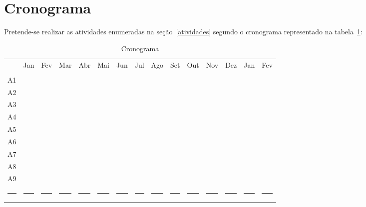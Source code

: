 \section{Cronograma}
\label{cronograma}


Pretende-se realizar as atividades enumeradas na seção~\ref{atividades} segundo o cronograma representado na tabela~\ref{table:cronograma}: 

\begin{table}[h]
\centering
\begin{tabular}{|c|c|c|c|c|c|c|c|c|c|c|c|c|c|c|}
    \hline
 & Jan & Fev & Mar & Abr & Mai & Jun & Jul & Ago & Set & Out & Nov & Dez & Jan & Fev\\    
	\cline{2-15}
 & & & & & & & & & & & & & & \\
	\hline
A1 & \cellcolor{black} & \cellcolor{black} & & & & & & & & & & & & \\
	\hline
A2 & & \cellcolor{black} & \cellcolor{black} & & & & & & & & & & & \\
	\hline
A3 & & & & \cellcolor{black} & & & & & & & & & & \\
	\hline
A4 & & & & & \cellcolor{black} & & & & & & & & & \\
	\hline
A5 & & & & & & \cellcolor{black} & \cellcolor{black} & \cellcolor{black} & \cellcolor{black} & \cellcolor{black} & & & & \\
    \hline
A6 & & & & & & & & & \cellcolor{black} & & & & & \\
    \hline
A7 & & & \cellcolor{black} & \cellcolor{black} & \cellcolor{black} & \cellcolor{black} & \cellcolor{black} & \cellcolor{black} & \cellcolor{black} & \cellcolor{black} & \cellcolor{black} & \cellcolor{black} & & \\
    \hline
A8 & & & & & \cellcolor{black} & \cellcolor{black} & \cellcolor{black} & \cellcolor{black} & \cellcolor{black} & \cellcolor{black} & \cellcolor{black} & \cellcolor{black} & \cellcolor{black}& \cellcolor{black} \\
    \hline
A9 & & & & & & & & & & & & & \cellcolor{black} & \cellcolor{black} \\
	\hline
\multicolumn{1}{c}{\rule{0.3cm}{0cm}} &
\multicolumn{1}{c}{\rule{0.4cm}{0cm}} &
\multicolumn{1}{c}{\rule{0.4cm}{0cm}} &
\multicolumn{1}{c}{\rule{0.4cm}{0cm}} &
\multicolumn{1}{c}{\rule{0.4cm}{0cm}} &
\multicolumn{1}{c}{\rule{0.4cm}{0cm}} &
\multicolumn{1}{c}{\rule{0.4cm}{0cm}} &
\multicolumn{1}{c}{\rule{0.4cm}{0cm}} &
\multicolumn{1}{c}{\rule{0.4cm}{0cm}} &
\multicolumn{1}{c}{\rule{0.4cm}{0cm}} &
\multicolumn{1}{c}{\rule{0.4cm}{0cm}} &
\multicolumn{1}{c}{\rule{0.4cm}{0cm}} &
\multicolumn{1}{c}{\rule{0.4cm}{0cm}} &
\multicolumn{1}{c}{\rule{0.4cm}{0cm}} &
\multicolumn{1}{c}{\rule{0.4cm}{0cm}} \\
\end{tabular}
\caption{Cronograma}
\label{table:cronograma}
\end{table}
